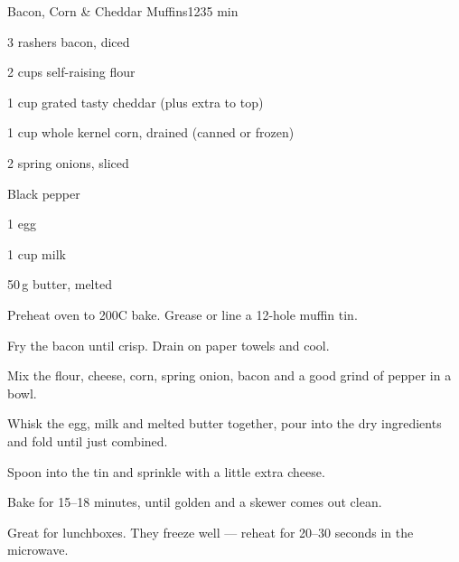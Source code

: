 \begin{recipebox}{Bacon, Corn \& Cheddar Muffins}{12}{35 min}
\begin{ingredients}
  \item 3 rashers bacon, diced
  \item 2 cups self-raising flour
  \item 1 cup grated tasty cheddar (plus extra to top)
  \item 1 cup whole kernel corn, drained (canned or frozen)
  \item 2 spring onions, sliced
  \item Black pepper
  \item 1 egg
  \item 1 cup milk
  \item 50\,g butter, melted
\end{ingredients}

\begin{method}
  \item Preheat oven to 200\degree C bake. Grease or line a 12-hole muffin tin.
  \item Fry the bacon until crisp. Drain on paper towels and cool.
  \item Mix the flour, cheese, corn, spring onion, bacon and a good grind of pepper in a bowl.
  \item Whisk the egg, milk and melted butter together, pour into the dry ingredients and fold until just combined.
  \item Spoon into the tin and sprinkle with a little extra cheese.
  \item Bake for 15--18 minutes, until golden and a skewer comes out clean.
\end{method}

\begin{notes}
Great for lunchboxes. They freeze well --- reheat for 20--30 seconds in the microwave.
\end{notes}
\end{recipebox}
